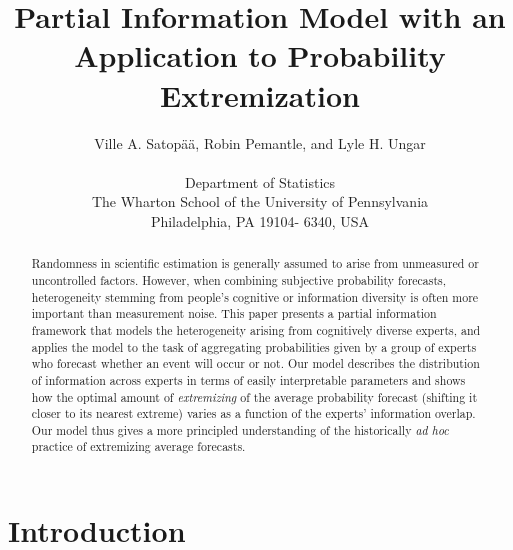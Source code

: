 \documentclass[11pt,twoside]{article}
\begin{document}
\title{Partial Information Model with an Application to Probability Extremization}
\author{
Ville A. Satop\"a\"a, Robin Pemantle, and Lyle H. Ungar\\
\\
 \small Department of Statistics\\
 \small The Wharton School of the University of Pennsylvania\\
 \small Philadelphia, PA 19104- 6340, USA\\ [-0.25in]} \date{}
\maketitle

\pagestyle{myheadings}
\thispagestyle{empty}

\begin{abstract}
Randomness in scientific estimation is generally assumed to arise from
unmeasured or uncontrolled factors. However, when combining subjective probability forecasts, heterogeneity stemming from people's cognitive or information diversity is often
more important than measurement noise.  This paper presents a
partial information framework that models the heterogeneity arising
from cognitively diverse experts, and applies the model to the task of
aggregating probabilities given by a group of experts who forecast
whether an event will occur or not. Our model describes the
distribution of information across experts in terms of easily
interpretable parameters and shows how the optimal amount
of \textit{extremizing} of the average probability forecast (shifting
it closer to its nearest extreme) varies as a function of the experts'
information overlap.  Our model thus gives a more principled
understanding of the historically {\it ad hoc} practice of extremizing
average forecasts.
\end{abstract}



\section{Introduction}
\end{document}

